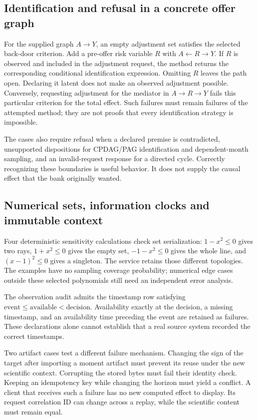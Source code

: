 \subsection{Identification and refusal in a concrete offer graph}

For the supplied graph $A\to Y$, an empty adjustment set satisfies the selected
back-door criterion. Add a pre-offer risk variable $R$ with
$A\leftarrow R\to Y$. If $R$ is observed and included in the adjustment
request, the method returns the corresponding conditional identification
expression. Omitting $R$ leaves the path open. Declaring it latent does not
make an observed adjustment possible. Conversely, requesting adjustment for
the mediator in $A\to R\to Y$ fails this particular criterion for the total
effect. Such failures must remain failures of the attempted method; they are
not proofs that every identification strategy is impossible.

The cases also require refusal when a declared premise is contradicted,
unsupported dispositions for CPDAG/PAG identification and dependent-month
sampling, and an invalid-request response for a directed cycle. Correctly
recognizing these boundaries is useful behavior. It does not supply the causal
effect that the bank originally wanted.

\subsection{Numerical sets, information clocks and immutable context}

Four deterministic sensitivity calculations check set serialization:
$1-x^2\le0$ gives two rays, $1+x^2\le0$ gives the empty set,
$-1-x^2\le0$ gives the whole line, and $(x-1)^2\le0$ gives a singleton.
The service retains those different topologies. The examples have no sampling
coverage probability; numerical edge cases outside these selected polynomials
still need an independent error analysis.

The observation audit admits the timestamp row satisfying
$\text{event}\le\text{available}<\text{decision}$. Availability exactly at
the decision, a missing timestamp, and an availability time preceding the event
are retained as failures. These declarations alone cannot establish that a
real source system recorded the correct timestamps.

Two artifact cases test a different failure mechanism. Changing the sign of
the target after importing a moment artifact must prevent its reuse under the
new scientific context. Corrupting the stored bytes must fail their identity
check. Keeping an idempotency key while changing the horizon must yield a
conflict. A client that receives such a failure has no new computed effect to
display. Its request correlation ID can change across a replay, while the
scientific content must remain equal.

